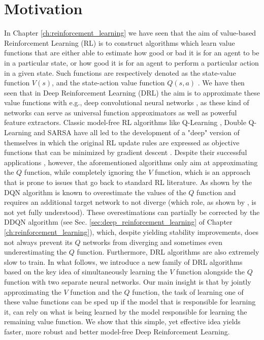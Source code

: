 \section{Motivation}
\label{sec:ijcnn_introduction}

In Chapter \ref{ch:reinforcement_learning} we have seen that the aim of value-based Reinforcement Learning (RL) is to construct algorithms which learn value functions that are either able to estimate how good or bad it is for an agent to be in a particular state, or how good it is for an agent to perform a particular action in a given state. Such functions are respectively denoted as the state-value function $V(s)$, and the state-action value function $Q(s,a)$ \cite{sutton2018reinforcement}. We have then seen that in Deep Reinforcement Learning (DRL) the aim is to approximate these value functions with e.g., deep convolutional neural networks \cite{lecun2015deep}, as these kind of networks can serve as universal function approximators as well as powerful feature extractors. Classic model-free RL algorithms like Q-Learning \cite{watkins1992q}, Double Q-Learning \cite{hasselt2010double} and SARSA \cite{rummery1994line} have all led to the development of a "deep" version of themselves in which the original RL update rules are expressed as objective functions that can be minimized by gradient descent \cite{mnih2015human, van2016deep, zhao2016deep}. Despite their successful applications \cite{li2017deep}, however, the aforementioned algorithms only aim at approximating the $Q$ function, while completely ignoring the $V$ function, which is an approach that is prone to issues that go back to standard RL literature. As shown by \citet{van2016deep} the DQN algorithm \cite{mnih2015human} is known to overestimate the values of the $Q$ function and requires an additional target network to not diverge (which role, as shown by \citet{achiam2019towards}, is not yet fully understood). These overestimations can partially be corrected by the DDQN \cite{van2016deep} algorithm (see Sec. \ref{sec:deep_reinforcement_learning} of Chapter \ref{ch:reinforcement_learning}), which, despite yielding stability improvements, does not always prevent its $Q$ networks from diverging \cite{van2018deep_triad} and sometimes even underestimating the $Q$ function. Furthermore, DRL algorithms are also extremely slow to train. In what follows, we introduce a new family of DRL algorithms based on the key idea of simultaneously learning the $V$ function alongside the $Q$ function with two separate neural networks. Our main insight is that by jointly approximating the $V$ function and the $Q$ function, the task of learning one of these value functions can be sped up if the model that is responsible for learning it, can rely on what is being learned by the model responsible for learning the remaining value function. We show that this simple, yet effective idea yields faster, more robust and better model-free Deep Reinforcement Learning.


